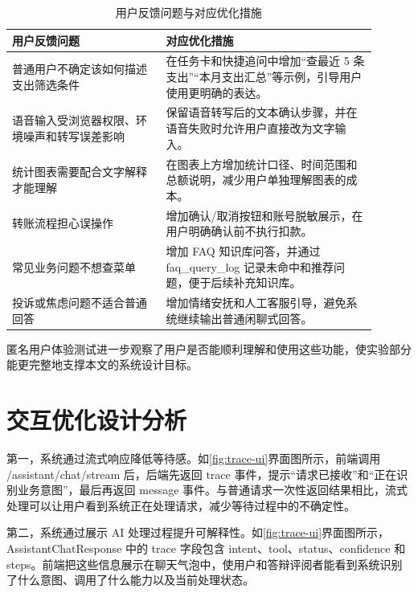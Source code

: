 \documentclass[bachelor, print]{xduthesis}
\begin{document}
\begin{table}[H]
    \centering
    \caption{用户反馈问题与对应优化措施}
    \label{tab:user-feedback-optimization}
    \small
    \setlength{\tabcolsep}{4pt}
    \begin{tabular}{|p{0.38\linewidth}|p{0.52\linewidth}|}
        \hline
        用户反馈问题 & 对应优化措施 \\
        \hline
        普通用户不确定该如何描述支出筛选条件 & 在任务卡和快捷追问中增加“查最近 5 条支出”“本月支出汇总”等示例，引导用户使用更明确的表达。 \\
        \hline
        语音输入受浏览器权限、环境噪声和转写误差影响 & 保留语音转写后的文本确认步骤，并在语音失败时允许用户直接改为文字输入。 \\
        \hline
        统计图表需要配合文字解释才能理解 & 在图表上方增加统计口径、时间范围和总额说明，减少用户单独理解图表的成本。 \\
        \hline
        转账流程担心误操作 & 增加确认/取消按钮和账号脱敏展示，在用户明确确认前不执行扣款。 \\
        \hline
        常见业务问题不想查菜单 & 增加 FAQ 知识库问答，并通过 faq\_query\_log 记录未命中和推荐问题，便于后续补充知识库。 \\
        \hline
        投诉或焦虑问题不适合普通回答 & 增加情绪安抚和人工客服引导，避免系统继续输出普通闲聊式回答。 \\
        \hline
    \end{tabular}
\end{table}

匿名用户体验测试进一步观察了用户是否能顺利理解和使用这些功能，使实验部分能更完整地支撑本文的系统设计目标。

\section{交互优化设计分析}

第一，系统通过流式响应降低等待感。如\ref{fig:trace-ui}界面图所示，前端调用 /assistant/chat/stream 后，后端先返回 trace 事件，提示“请求已接收”和“正在识别业务意图”，最后再返回 message 事件。与普通请求一次性返回结果相比，流式处理可以让用户看到系统正在处理请求，减少等待过程中的不确定性。

第二，系统通过展示 AI 处理过程提升可解释性。如\ref{fig:trace-ui}界面图所示，AssistantChatResponse 中的 trace 字段包含 intent、tool、status、confidence 和 steps。前端把这些信息展示在聊天气泡中，使用户和答辩评阅者能看到系统识别了什么意图、调用了什么能力以及当前处理状态。
\end{document}
